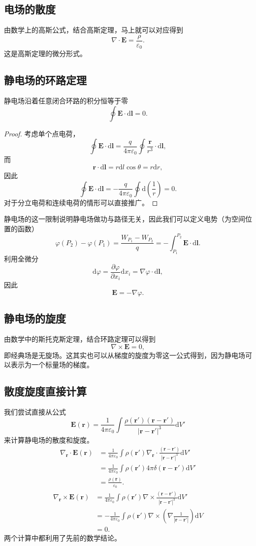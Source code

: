 \documentclass[UTF8]{ctexbook}
\renewcommand{\d}{\mathrm{d}}
\renewcommand{\b}{\boldsymbol}
\newtheorem{proof}{证明}
\numberwithin{equation}{chapter}
\begin{document}
	\subsection{电场的散度}
	由数学上的高斯公式，结合高斯定理，马上就可以对应得到
	\[\nabla\cdot\b{E}=\frac{\rho}{\varepsilon_0}.\]
	这是高斯定理的微分形式。
	
	\subsection{静电场的环路定理}
	静电场沿着任意闭合环路的积分恒等于零
	\[\oint \b{E}\cdot\d \b{l}=0.\]
	\begin{proof}
		考虑单个点电荷，
		\[\oint\b{E}\cdot\d\b{l}=\frac{q}{4\pi\varepsilon_0}\oint\frac{\b{r}}{r^3}\cdot\d\b{l},\]
		而
		\[\b{r}\cdot\d\b{l}=r\d l\cos\theta=r\d r,\]
		因此
		\[\oint\b{E}\cdot\d\b{l}=-\frac{q}{4\pi\varepsilon_0}\oint\d\left(\frac{1}{r}\right)=0.\]
		对于分立电荷和连续电荷的情形可以直接推广。
	\end{proof}

	静电场的这一限制说明静电场做功与路径无关，因此我们可以定义电势（为空间位置的函数）
	\[\varphi(P_2)-\varphi(P_1)=\frac{W_{P_1}-W_{P_2}}{q}=-\int_{P_1}^{P_2}\b{E}\cdot\d\b{l}.\]
	利用全微分
	\[\d\varphi=\frac{\partial \varphi}{\partial x_i}\d x_i=\nabla\varphi \cdot\d\b{l},\]
	因此
	\[\b{E}=-\nabla\varphi.\]
	
	\subsection{静电场的旋度}
	由数学中的斯托克斯定理，结合环路定理可以得到
	\[\nabla\times\b{E}=0,\]
	即经典场是无旋场。这其实也可以从梯度的旋度为零这一公式得到，因为静电场可以表示为一个标量场的梯度。
	
	\subsection{散度旋度直接计算}
	我们尝试直接从公式
	\[\b{E}(\b{r})=\frac{1}{4\pi\varepsilon_0}\int\frac{\rho(\b{r}')(\b{r}-\b{r}')}{|\b{r}-\b{r}'|^3}\d V'\]
	来计算静电场的散度和旋度。
	\begin{align*}
		\nabla_{\b{r}}\cdot\b{E}(\b{r})&=\frac{1}{4\pi\varepsilon_0}\int\rho(\b{r}')\nabla_{\b{r}}\cdot\frac{(\b{r}-\b{r}')}{|\b{r}-\b{r}'|^3}\d V' \\
		&=\frac{1}{4\pi\varepsilon_0}\int\rho(\b{r}')4\pi\delta(\b{r}-\b{r}')\d V' \\
		&=\frac{\rho(\b{r})}{\varepsilon_0}.
	\end{align*}
	\begin{align*}
		\nabla_{\b{r}}\times\b{E}(\b{r})&=\frac{1}{4\pi\varepsilon_0}\int\rho(\b{r}')\nabla\times\frac{(\b{r}-\b{r}')}{|\b{r}-\b{r}'|^3}\d V' \\
		&=-\frac{1}{4\pi\varepsilon_0}\int\rho(\b{r}')\nabla\times\left(\nabla\frac{1}{|\b{r}-\b{r}'|}\right)\d V \\
		&=0.
	\end{align*}
	两个计算中都利用了先前的数学结论。
	
\end{document}
